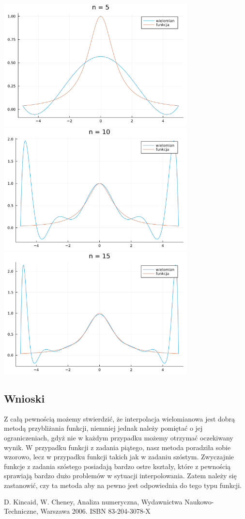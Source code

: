 \documentclass{article}
\begin{document}
\begin{center}
    \includegraphics[width=100mm]{z6f2_5.png}
    \includegraphics[width=100mm]{z6f2_10.png}
    \includegraphics[width=100mm]{z6f2_15.png}

    \subsection{Wnioski}
    Z całą pewnością możemy stwierdzić, że interpolacja wielomianowa jest dobrą metodą przybliżania funkcji, niemniej jednak należy pomiętać o jej ograniczeniach,
    gdyż nie w każdym przypadku możemy otrzymać oczekiwany wynik. W przypadku funkcji z zadania piątego, nasz metoda poradziła sobie wzorowo, lecz w przypadku funkcji takich jak w zadaniu szóstym.
    Zwyczajnie funkcje z zadania szóstego posiadają bardzo ostre kształy, które z pewnością sprawiają bardzo dużo problemów w sytuacji interpolowania.
    Zatem należy się zastanowić, czy ta metoda aby na pewno jest odpowiednia do tego typu funkcji.
    \end{center}
    \begin{thebibliography}{100}
         D. Kincaid, W. Cheney, Analiza numeryczna, Wydawnictwa Naukowo-Techniczne, Warszawa 2006. ISBN 83-204-3078-X
    \end{thebibliography}
\end{document}
